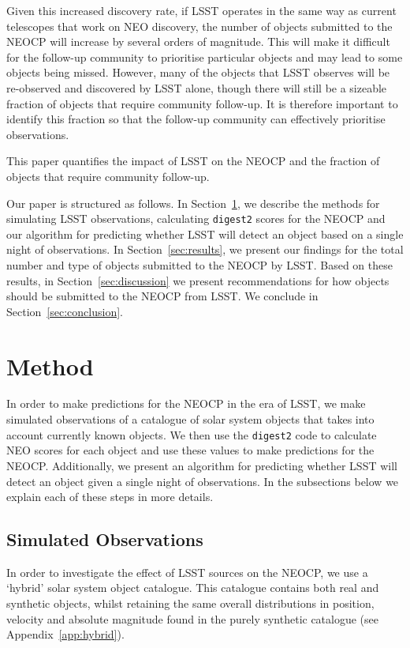 \documentclass[twocolumn]{aastex631}
\newcommand{\dig}{\texttt{digest2}}
\begin{document}
Given this increased discovery rate, if LSST operates in the same way as current telescopes that work on NEO discovery, the number of objects submitted to the NEOCP will increase by several orders of magnitude. This will make it difficult for the follow-up community to prioritise particular objects and may lead to some objects being missed. However, many of the objects that LSST observes will be re-observed and discovered by LSST alone, though there will still be a sizeable fraction of objects that require community follow-up. It is therefore important to identify this fraction so that the follow-up community can effectively prioritise observations.

This paper quantifies the impact of LSST on the NEOCP and the fraction of objects that require community follow-up.

Our paper is structured as follows. In Section~\ref{sec:method}, we describe the methods for simulating LSST observations, calculating \dig{} scores for the NEOCP and our algorithm for predicting whether LSST will detect an object based on a single night of observations. In Section~\ref{sec:results}, we present our findings for the total number and type of objects submitted to the NEOCP by LSST. Based on these results, in Section~\ref{sec:discussion} we present recommendations for how objects should be submitted to the NEOCP from LSST. We conclude in Section~\ref{sec:conclusion}.

\section{Method} \label{sec:method}
In order to make predictions for the NEOCP in the era of LSST, we make simulated observations of a catalogue of solar system objects that takes into account currently known objects. We then use the \dig{} code to calculate NEO scores for each object and use these values to make predictions for the NEOCP. Additionally, we present an algorithm for predicting whether LSST will detect an object given a single night of observations. In the subsections below we explain each of these steps in more details.

\subsection{Simulated Observations}

In order to investigate the effect of LSST sources on the NEOCP, we use a `hybrid' solar system object catalogue. This catalogue contains both real and synthetic objects, whilst retaining the same overall distributions in position, velocity and absolute magnitude found in the purely synthetic catalogue (see Appendix~\ref{app:hybrid}).
\end{document}
